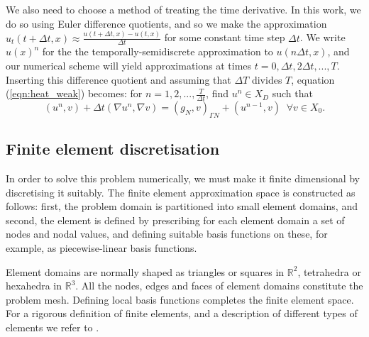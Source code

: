 We also need to choose a method of treating the time derivative. In this work, we do so using Euler difference quotients, and so we make the approximation $u_{t}(t+\Delta t,x) \approx \frac{u(t+\Delta t,x) - u(t,x)}{\Delta t}$ for some constant time step $\Delta t$. We write $u(x)^{n}$ for the the temporally-semidiscrete approximation to $u(n\Delta t,x)$, and our numerical scheme will yield approximations at times $t=0,\Delta t,2\Delta t,...,T$. Inserting this difference quotient and assuming that $\Delta T$ divides $T$, equation (\ref{eqn:heat_weak}) becomes: for $n=1,2,...,\frac{T}{\Delta t}$, find $u^{n}\in X_{D}$ such that
\begin{equation}
\left( u^{n},v \right) + \Delta t \left(\nabla u^{n},\nabla v \right)=\left(g_{N} ,v \right)_{\Gamma N}+\left( u^{n-1},v \right) \;\;\forall v \in X_{0}.
\label{eqn:heat_weak}
\end{equation}
%
\subsection{Finite element discretisation}
In order to solve this problem numerically, we must make it finite dimensional by discretising it suitably. The finite element approximation space is constructed as follows: first, the problem domain is partitioned into small element domains, and second, the element is defined by prescribing for each element domain a set of nodes and nodal values, and defining  suitable basis functions on these, for example, as piecewise-linear basis functions. 

Element domains are normally shaped as triangles or squares in $\mathbb{R}^{2}$, tetrahedra or hexahedra in $\mathbb{R}^{3}$. All the nodes, edges and faces of element domains constitute
the problem mesh. Defining local basis functions completes the finite element space. For a rigorous definition of finite elements, and a description of different types of elements we refer to \citet{brenner2008mathematical}. 

